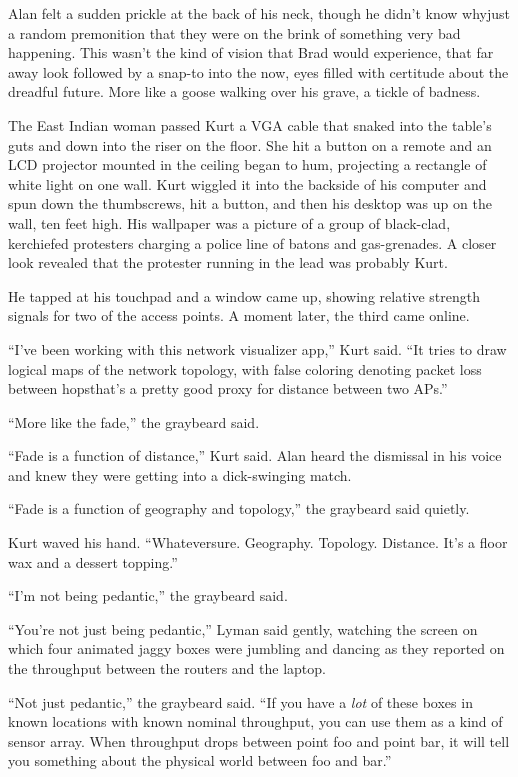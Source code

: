 Alan felt a sudden prickle at the back of his neck, though he didn't
know why\dash{}just a random premonition that they were on the brink of
something very bad happening.  This wasn't the kind of vision that
Brad would experience, that far away look followed by a snap-to into
the now, eyes filled with certitude about the dreadful future.  More
like a goose walking over his grave, a tickle of badness.

The East Indian woman passed Kurt a VGA cable that snaked into the
table's guts and down into the riser on the floor.  She hit a button
on a remote and an LCD projector mounted in the ceiling began to hum,
projecting a rectangle of white light on one wall.  Kurt wiggled it
into the backside of his computer and spun down the thumbscrews, hit a
button, and then his desktop was up on the wall, ten feet high.  His
wallpaper was a picture of a group of black-clad, kerchiefed
protesters charging a police line of batons and gas-grenades.  A
closer look revealed that the protester running in the lead was
probably Kurt.

He tapped at his touchpad and a window came up, showing relative
strength signals for two of the access points.  A moment later, the
third came online.

``I've been working with this network visualizer app,'' Kurt said. 
``It tries to draw logical maps of the network topology, with false
coloring denoting packet loss between hops\dash{}that's a pretty good
proxy for distance between two APs.''

``More like the fade,'' the graybeard said.

``Fade is a function of distance,'' Kurt said.  Alan heard the
dismissal in his voice and knew they were getting into a dick-swinging
match.

``Fade is a function of geography and topology,'' the graybeard said
quietly.

Kurt waved his hand.  ``Whatever\dash{}sure.  Geography.  Topology. 
Distance.  It's a floor wax and a dessert topping.''

``I'm not being pedantic,'' the graybeard said.

``You're not just being pedantic,'' Lyman said gently, watching the
screen on which four animated jaggy boxes were jumbling and dancing as
they reported on the throughput between the routers and the laptop.

``Not just pedantic,'' the graybeard said.  ``If you have a
\textit{lot} of these boxes in known locations with known nominal
throughput, you can use them as a kind of sensor array.  When
throughput drops between point foo and point bar, it will tell you
something about the physical world between foo and bar.''

